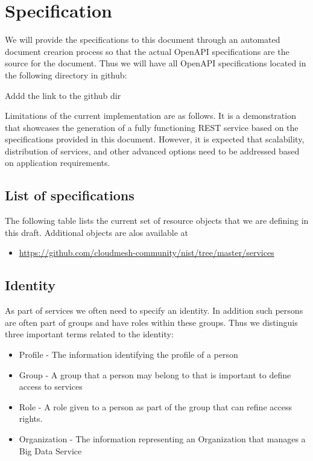 \documentclass[9pt,]{article}
\newenvironment{Shaded}{}{}
\newcommand{\ExtensionTok}[1]{#1}
\newcommand{\NormalTok}[1]{#1}
\providecommand{\tightlist}{%
  \setlength{\itemsep}{0pt}\setlength{\parskip}{0pt}}
\begin{document}
\hypertarget{specification}{%
\section{Specification}\label{specification}}

We will provide the specifications to this document through an automated
document crearion process so that the actual OpenAPI specifications are
the source for the document. Thus we will have all OpenAPI
specifications located in the following directory in github:

\begin{Shaded}
\begin{Highlighting}[]
\ExtensionTok{Addd}\NormalTok{ the link to the github dir}
\end{Highlighting}
\end{Shaded}

Limitations of the current implementation are as follows. It is a
demonstration that showcases the generation of a fully functioning REST
service based on the specifications provided in this document. However,
it is expected that scalability, distribution of services, and other
advanced options need to be addressed based on application requirements.

\hypertarget{list-of-specifications}{%
\subsection{List of specifications}\label{list-of-specifications}}

The following table lists the current set of resource objects that we
are defining in this draft. Additional objects are alos available at

\begin{itemize}
\tightlist
\item
  \url{https://github.com/cloudmesh-community/nist/tree/master/services}
\end{itemize}

\hypertarget{identity}{%
\subsection{Identity}\label{identity}}

As part of services we often need to specify an identity. In addition
such persons are often part of groups and have roles within these
groups. Thus we distinguis three important terms related to the
identity:

\begin{itemize}
\tightlist
\item
  Profile - The information identifying the profile of a person
\item
  Group - A group that a person may belong to that is important to
  define access to services
\item
  Role - A role given to a person as part of the group that can refine
  access rights.
\item
  Organization - The information representing an Organization that
  manages a Big Data Service
\end{itemize}
\end{document}
